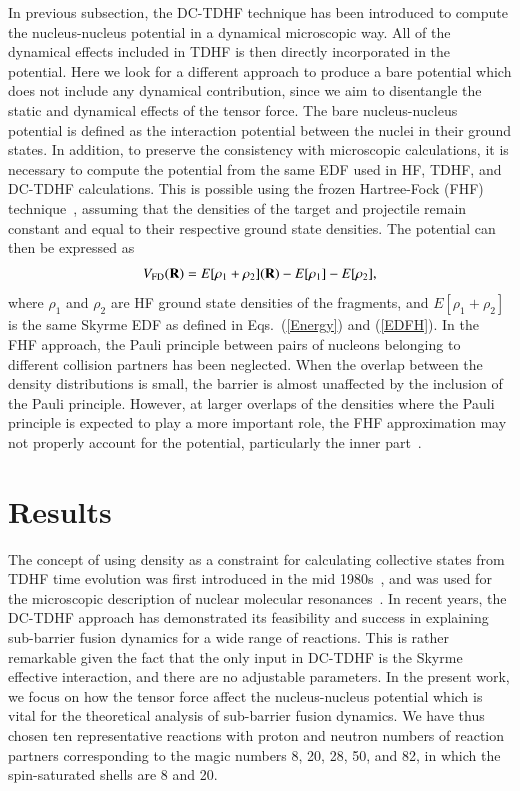 In previous subsection, the DC-TDHF technique has been introduced to compute the nucleus-nucleus potential in a dynamical microscopic way.
All of the dynamical effects included in TDHF is then directly incorporated in the potential. Here we look for a different approach
to produce a bare potential which does not include any dynamical contribution, since we aim to disentangle the static and dynamical effects
of the tensor force. The bare nucleus-nucleus potential is defined as the interaction potential between the nuclei in their ground states.
In addition, to preserve the consistency with microscopic calculations, it is necessary to compute the potential from the same EDF used in
HF, TDHF, and DC-TDHF calculations. This is possible using the frozen Hartree-Fock (FHF) technique~\citep{Simenel2013_PRC88-064604},
assuming that the densities of the target and
projectile remain constant and equal to their respective ground state densities.
The potential can then be expressed as
\begin{align}
\label{eq:FD}
V_\mathrm{FD}(\textbf R)=E[\rho_\mathrm{1}+\rho_\mathrm{2}](\textbf R)-E[\rho_\mathrm{1}]-E[\rho_\mathrm{2}],
\end{align}
where $\rho_\mathrm{1}$ and $\rho_\mathrm{2}$ are HF ground state densities of the fragments, and $E[\rho_\mathrm{1}+\rho_\mathrm{2}]$ is the same
Skyrme EDF as defined in Eqs.~(\ref{Energy}) and (\ref{EDFH}). In the FHF approach, the Pauli principle between pairs of nucleons belonging to different
collision partners has been neglected. When the overlap between the density distributions is small, the barrier is almost unaffected by the inclusion of the Pauli principle.
However, at larger overlaps of the densities where the Pauli principle is expected to play a more important role, the FHF approximation may not properly
account for the potential, particularly the inner part~\citep{Simenel2017_PRC95-031601}.

\section{Results}
\label{discuss}

The concept of using density as a constraint for calculating collective states from TDHF time evolution was first introduced in the mid 1980s~\citep{Cusson1985_ZPA320-475}, and was used for the microscopic description of nuclear molecular resonances~\citep{Umar1985_PRC32-172}.
In recent years, the DC-TDHF approach has demonstrated its feasibility and success in explaining sub-barrier fusion dynamics for a wide range of reactions.
This is rather remarkable given the fact that the only input in DC-TDHF is the Skyrme effective interaction, and there are no adjustable parameters.
In the present work, we focus on how the tensor force affect the nucleus-nucleus potential which is vital for the theoretical analysis of sub-barrier fusion dynamics.
We have thus chosen ten representative reactions with proton and neutron numbers of reaction partners corresponding to the magic numbers 8, 20, 28, 50, and 82,
in which the spin-saturated shells are 8 and 20.

